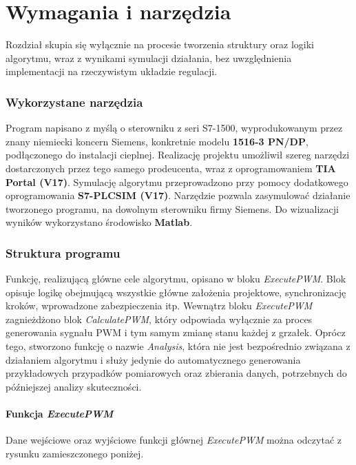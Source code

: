\documentclass[a4paper,twoside,12pt]{book}
\begin{document}
\chapter{Wymagania i narzędzia}
\label{ch:04}

Rozdział skupia się wyłącznie na procesie tworzenia struktury oraz logiki algorytmu, wraz z wynikami symulacji działania, bez uwzględnienia implementacji na rzeczywistym układzie regulacji.

\subsection{Wykorzystane narzędzia}
Program napisano z myślą o sterowniku z seri S7-1500, wyprodukowanym przez znany niemiecki koncern Siemens, konkretnie modelu \textbf{1516-3 PN/DP}, podłączonego do instalacji cieplnej. Realizację projektu umożliwił szereg narzędzi dostarczonych przez tego samego prodeucenta, wraz z oprogramowaniem \textbf{TIA Portal (V17)}\cite{berger2013automating}. Symulację algorytmu przeprowadzono przy pomocy dodatkowego oprogramowania \textbf{S7-PLCSIM (V17)}. Narzędzie pozwala zasymulować działanie tworzonego programu, na dowolnym sterowniku firmy Siemens. Do wizualizacji wyników wykorzystano środowisko \textbf{Matlab}.

\subsection{Struktura programu}
Funkcję, realizującą główne cele algorytmu, opisano w bloku \textit{ExecutePWM}. Blok opisuje logikę obejmującą wszystkie główne założenia projektowe, synchronizację kroków, wprowadzone zabezpieczenia itp. Wewnątrz bloku \textit{ExecutePWM} zagnieżdżono blok \textit{CalculatePWM}, który odpowiada wyłącznie za proces generowania sygnału PWM i tym samym zmianę stanu każdej z grzałek. Oprócz tego, stworzono funkcję o nazwie \textit{Analysis}, która nie jest bezpośrednio związana z działaniem algorytmu i służy jedynie do automatycznego generowania przykładowych przypadków pomiarowych oraz zbierania danych, potrzebnych do późniejszej analizy skuteczności.

\newpage
\subsubsection{Funkcja \textit{ExecutePWM}}
Dane wejściowe oraz wyjściowe funkcji głównej \textit{ExecutePWM} można odczytać z rysunku zamieszczonego poniżej.
\end{document}
